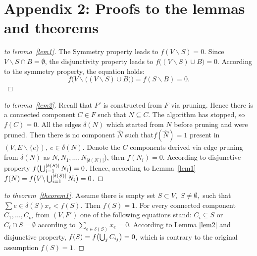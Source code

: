 \documentclass[12pt]{article}
\newtheorem{proof}{Proof}
\begin{document}
\section*{Appendix 2: Proofs to the lemmas and theorems}


\begin{proof}[to lemma~\ref{lem1}]
    The Symmetry property leads to $f (V\backslash S) = 0$. Since $V\backslash S \cap B = \emptyset$, the disjunctivity property leads to $f \big((V\backslash S)\cup B\big) = 0$. According to the symmetry property, the  equation holds:  \[f\Big( V\backslash \big((V\backslash S)\cup B\big)\Big) = f(S\backslash B) = 0. \]
\end{proof}
\begin{proof}[to lemma~\ref{lem2}]
    Recall that $F'$ is constructed from $F$ via pruning. Hence there is a connected component $C\in F$ such that $N\subseteq C$. The algorithm has stopped, so $f(C) = 0$. All the edges $\delta(N)$ which started from $N$ before pruning and were pruned. Then there is no component $\hat{N}$ such that$f(\hat{N})=1$ present in $(V, E\backslash\{e\}),~e\in\delta(N)$.
    Denote the $C$ components derived via edge pruning from $\delta(N)$ as $N,N_1,\ldots,N_{|\delta(N)|}$), then $f(N_i) = 0$. According to disjunctive property $f\bigl(\bigcup_{i=1}^{|\delta(S)|} N_i\bigr) = 0$. Hence, according to Lemma~\ref{lem1}  $f(N) = f\bigl( V\backslash\bigcup_{i=1}^{|\delta(S)|} N_i\bigr) = 0$.
\end{proof}
\begin{proof}[to theorem~\ref{theorem1}]
    Assume there is empty set $S \subset V, \; S \not= \emptyset,$ such that $\sum{e\in \delta(S)}x_e < f(S)$.
    Then $f(S) = 1$. For every connected component $C_1,\ldots,C_m$ from $(V,F')$ one of the following equations stand:
    $C_i\subseteq S$ or $C_i\cap S = \emptyset$ according to $\sum_{e\in \delta(S)}x_e=0$.
    According to Lemma \ref{lem2} and disjunctive property, $f(S) = f\bigl(\bigcup_{j}C_{i_j}\bigr) = 0$, which is contrary to the original assumption $f(S) = 1$.
\end{proof}
\end{document}

